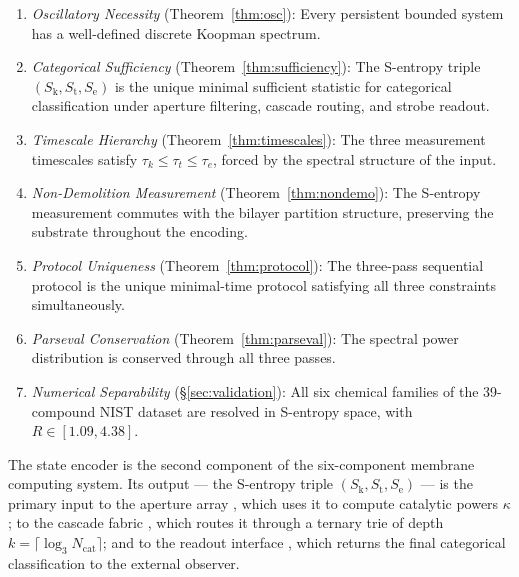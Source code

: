 \documentclass[11pt,twocolumn,a4paper]{article}
\theoremstyle{definition}
\theoremstyle{remark}
\newcommand{\Sk}{S_{\mathrm{k}}}
\newcommand{\St}{S_{\mathrm{t}}}
\newcommand{\Se}{S_{\mathrm{e}}}
\begin{document}
\begin{enumerate}[nosep]
\item \textit{Oscillatory Necessity} (Theorem~\ref{thm:osc}): Every persistent
  bounded system has a well-defined discrete Koopman spectrum.
\item \textit{Categorical Sufficiency} (Theorem~\ref{thm:sufficiency}): The
  S-entropy triple $(\Sk, \St, \Se)$ is the unique minimal sufficient statistic
  for categorical classification under aperture filtering, cascade routing,
  and strobe readout.
\item \textit{Timescale Hierarchy} (Theorem~\ref{thm:timescales}): The three
  measurement timescales satisfy $\tau_k \leq \tau_t \leq \tau_e$, forced
  by the spectral structure of the input.
\item \textit{Non-Demolition Measurement} (Theorem~\ref{thm:nondemo}):
  The S-entropy measurement commutes with the bilayer partition structure,
  preserving the substrate throughout the encoding.
\item \textit{Protocol Uniqueness} (Theorem~\ref{thm:protocol}): The three-pass
  sequential protocol is the unique minimal-time protocol satisfying all
  three constraints simultaneously.
\item \textit{Parseval Conservation} (Theorem~\ref{thm:parseval}): The spectral
  power distribution is conserved through all three passes.
\item \textit{Numerical Separability} (\S\ref{sec:validation}): All six chemical
  families of the 39-compound NIST dataset are resolved in S-entropy space,
  with $R \in [1.09, 4.38]$.
\end{enumerate}

The state encoder is the second component of the six-component membrane computing
system. Its output --- the S-entropy triple $(\Sk, \St, \Se)$ --- is the primary
input to the aperture array \citep{companion3}, which uses it to compute catalytic
powers $\kappa$; to the cascade fabric \citep{companion5}, which routes it
through a ternary trie of depth $k = \lceil\log_3 N_{\mathrm{cat}}\rceil$;
and to the readout interface \citep{companion6}, which returns the final
categorical classification to the external observer.



\end{document}
